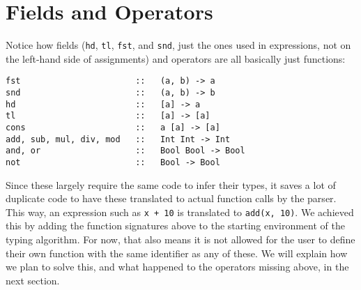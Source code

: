 \section{Fields and Operators}
Notice how fields (\lstinline|hd|, \lstinline|tl|, \lstinline|fst|, and \lstinline|snd|, just the ones used in expressions, not on the left-hand side of assignments) and operators are all basically just functions:
\begin{lstlisting}[language=spl]
fst                       ::   (a, b) -> a
snd                       ::   (a, b) -> b
hd                        ::   [a] -> a
tl                        ::   [a] -> [a]
cons                      ::   a [a] -> [a]
add, sub, mul, div, mod   ::   Int Int -> Int
and, or                   ::   Bool Bool -> Bool
not                       ::   Bool -> Bool
\end{lstlisting}
Since these largely require the same code to infer their types, it saves a lot of duplicate code to have these translated to actual function calls by the parser. This way, an expression such as \lstinline|x + 10| is translated to \lstinline|add(x, 10)|. We achieved this by adding the function signatures above to the starting environment of the typing algorithm. For now, that also means it is not allowed for the user to define their own function with the same identifier as any of these. We will explain how we plan to solve this, and what happened to the operators missing above, in the next section.

